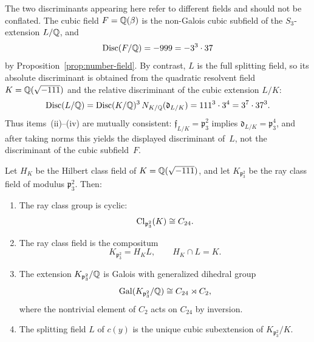 \begin{remark}\label{rem:disc-distinction}
The two discriminants appearing here refer to different fields and should not be conflated. The cubic field \(F=\mathbb{Q}(\beta)\) is the non-Galois cubic subfield of the \(S_3\)-extension \(L/\mathbb{Q}\), and
\[
\operatorname{Disc}(F/\mathbb{Q})=-999=-3^3\cdot 37
\]
by Proposition~\ref{prop:number-field}. By contrast, \(L\) is the full splitting field, so its absolute discriminant is obtained from the quadratic resolvent field \(K=\mathbb{Q}(\sqrt{-111})\) and the relative discriminant of the cubic extension \(L/K\):
\[
\operatorname{Disc}(L/\mathbb{Q})=\operatorname{Disc}(K/\mathbb{Q})^3\,N_{K/\mathbb{Q}}(\mathfrak d_{L/K})
=111^3\cdot 3^4
=3^7\cdot 37^3.
\]
Thus items~(ii)--(iv) are mutually consistent: \(\mathfrak f_{L/K}=\mathfrak p_3^2\) implies \(\mathfrak d_{L/K}=\mathfrak p_3^4\), and after taking norms this yields the displayed discriminant of~\(L\), not the discriminant of the cubic subfield~\(F\).
\end{remark}

\begin{theorem}\label{thm:ray-class}
Let \(H_K\) be the Hilbert class field of \(K=\mathbb{Q}(\sqrt{-111})\), and let \(K_{\mathfrak p_3^2}\) be the ray class field of modulus \(\mathfrak p_3^2\). Then:
\begin{enumerate}
\item[(i)] The ray class group is cyclic:
\[
\operatorname{Cl}_{\mathfrak p_3^2}(K)\cong C_{24}.
\]
\item[(ii)] The ray class field is the compositum
\[
K_{\mathfrak p_3^2}=H_KL,
\qquad
H_K\cap L=K.
\]
\item[(iii)] The extension \(K_{\mathfrak p_3^2}/\mathbb{Q}\) is Galois with generalized dihedral group
\[
\operatorname{Gal}(K_{\mathfrak p_3^2}/\mathbb{Q})\cong C_{24}\rtimes C_2,
\]
where the nontrivial element of \(C_2\) acts on \(C_{24}\) by inversion.
\item[(iv)] The splitting field \(L\) of \(c(y)\) is the unique cubic subextension of \(K_{\mathfrak p_3^2}/K\).
\end{enumerate}
\end{theorem}

